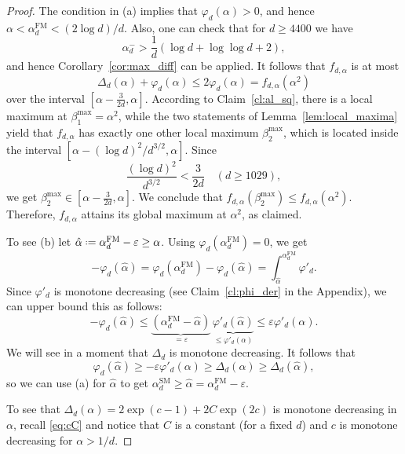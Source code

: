 \documentclass[12pt]{amsart}
\theoremstyle{definition}
\newcommand\al{\alpha}
\newcommand\alh{\hat{\alpha}}
\newcommand\be{\beta}
\newcommand\De{\Delta}
\newcommand\eps{\varepsilon}
\newcommand\alfm{\alpha^{\mathrm{FM}}}
\newcommand\alsm{\alpha^{\mathrm{SM}}}
\newcommand{\defeq}{\mathrel{\vcenter{\baselineskip0.5ex \lineskiplimit0pt
                     \hbox{\scriptsize.}\hbox{\scriptsize.}}}%
                     =}
\begin{document}
\begin{proof}
The condition in (a) implies that $\varphi_d(\al)>0$, and hence $\al < \alfm_d < (2 \log d)/d$. Also, one can check that for $d \geq 4400$ we have 
%
\[ \al_d^- > \frac{1}{d}(\log d + \log\log d + 2) ,\]
%
and hence Corollary~\ref{cor:max_diff} can be applied. It follows that $f_{d,\al}$ is at most 
%
\[ \De_{d}(\al) + \varphi_d(\al)
\leq 2 \varphi_d(\al) 
= f_{d,\al}(\al^2) \]
%
over the interval $[\al-\frac{3}{2d},\al]$. According to Claim~\ref{cl:al_sq}, there is a local maximum at $\be_1^{\max}=\al^2$, while the two statements of Lemma~\ref{lem:local_maxima} yield that $f_{d,\al}$ has exactly one other local maximum $\be_2^{\max}$, which is located inside the interval $[\al-{(\log d)^2}/{d^{3/2}},\al]$. Since 
%
\[ \frac{(\log d)^2}{d^{3/2}} < \frac{3}{2d} 
\quad (d \geq 1029) ,\]
%
we get $\be_2^{\max} \in [\al-\frac{3}{2d},\al]$. We conclude that $f_{d,\al}(\be_2^{\max}) \leq f_{d,\al}(\al^2)$. Therefore, $f_{d,\al}$ attains its global maximum at $\al^2$, as claimed. 

To see (b) let $\alh \defeq \alfm_d-\eps \geq \al$. Using $\varphi_d(\alfm_d)=0$, we get 
%
\[ -\varphi_d(\alh) 
= \varphi_d(\alfm_d) -\varphi_d(\alh) 
= \int_{\alh}^{\alfm_d} \varphi'_d .\]
%
Since $\varphi'_d$ is monotone decreasing (see Claim~\ref{cl:phi_der} in the Appendix),  we can upper bound this as follows:
%
\[ -\varphi_d(\alh) 
\leq \underbrace{(\alfm_d-\alh)}_{=\eps} \,
\underbrace{\varphi'_d(\alh)}_{\leq \varphi'_d(\al)} 
\leq \eps \varphi'_d(\al) .\]
%
We will see in a moment that $\De_d$ is monotone decreasing. It follows that 
%
\[ \varphi_d(\alh) 
\geq -\eps \varphi'_d(\al) 
\geq \De_d(\al) \geq \De_d(\alh) ,\]
%
so we can use (a) for $\alh$ to get $\alsm_d \geq \alh = \alfm_d - \eps$.

To see that $\De_d(\al)=2\exp(c-1)+2C\exp(2c)$ is monotone decreasing in $\al$, recall \eqref{eq:cC} and notice that $C$ is a constant (for a fixed $d$) and $c$ is monotone decreasing for $\al > 1/d$. 
\end{proof}
%
\end{document}
